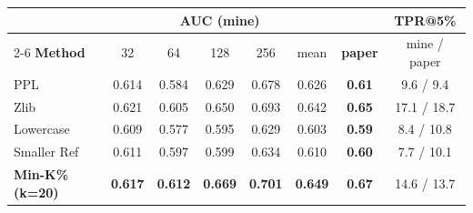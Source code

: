 \begin{tabular}{@{}lccccc>{\bfseries}cc@{}}
\toprule
 & \multicolumn{5}{c}{\textbf{AUC (mine)}} & & \textbf{TPR@5\%} \\
\cmidrule(lr){2-6}
\textbf{Method} & 32 & 64 & 128 & 256 & mean & \textbf{paper} & mine / paper \\
\midrule
PPL & 0.614 & 0.584 & 0.629 & 0.678 & 0.626 & 0.61 & 9.6 / 9.4 \\
Zlib & 0.621 & 0.605 & 0.650 & 0.693 & 0.642 & 0.65 & 17.1 / 18.7 \\
Lowercase & 0.609 & 0.577 & 0.595 & 0.629 & 0.603 & 0.59 & 8.4 / 10.8 \\
Smaller Ref & 0.611 & 0.597 & 0.599 & 0.634 & 0.610 & 0.60 & 7.7 / 10.1 \\
\textbf{Min-K\% (k=20)} & \textbf{0.617} & \textbf{0.612} & \textbf{0.669} & \textbf{0.701} & \textbf{0.649} & 0.67 & 14.6 / 13.7 \\
\bottomrule
\end{tabular}
